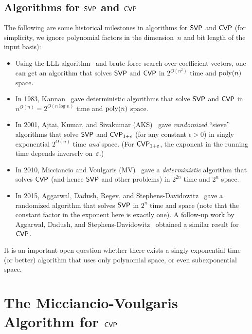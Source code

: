 \documentclass[11pt]{article}
\begin{document}
\subsection{Algorithms for $\mathsf{SVP}$ and $\mathsf{CVP}$}
\label{sec:algorithms-svp-cvp}

The following are some historical milestones in algorithms for $\mathsf{SVP}$
and $\mathsf{CVP}$ (for simplicity, we ignore polynomial factors in the
dimension~$n$ and bit length of the input basis):
\begin{itemize}[itemsep=0pt]
\item Using the LLL algorithm~\cite{lenstra82:_factor} and brute-force
  search over coefficient vectors, one can get an algorithm that
  solves $\mathsf{SVP}$ and $\mathsf{CVP}$ in $2^{O(n^{2})}$ time and $\operatorname{poly}(n)$
  space.
\item In 1983, Kannan~\cite{DBLP:conf/stoc/Kannan83} gave
  deterministic algorithms that solve $\mathsf{SVP}$ and $\mathsf{CVP}$ in
  $n^{O(n)} = 2^{O(n \log n)}$ time and $\operatorname{poly}(n)$ space.
\item In 2001, Ajtai, Kumar, and Sivakumar
  (AKS)~\cite{DBLP:conf/stoc/AjtaiKS01} gave \emph{randomized}
  ``sieve'' algorithms that solve $\mathsf{SVP}$ and $\mathsf{CVP}_{1+\epsilon}$ (for
  any constant $\epsilon > 0$) in singly exponential $2^{O(n)}$ time
  \emph{and} space. (For $\mathsf{CVP}_{1+\varepsilon}$, the exponent in the
  running time depends inversely on~$\varepsilon$.)
\item In 2010, Micciancio and Voulgaris
  (MV)~\cite{DBLP:conf/stoc/MicciancioV10} gave a \emph{deterministic}
  algorithm that solves $\mathsf{CVP}$ (and hence $\mathsf{SVP}$ and other problems)
  in $2^{2n}$ time and $2^{n}$ space.
\item In 2015, Aggarwal, Dadush, Regev, and
  Stephens-Davidowitz~\cite{DBLP:conf/stoc/AggarwalDRS15} gave a
  randomized algorithm that solves $\mathsf{SVP}$ in $2^{n}$ time and space
  (note that the constant factor in the exponent here is exactly one).
  A follow-up work by Aggarwal, Dadush, and
  Stephens-Davidowitz~\cite{DBLP:conf/focs/AggarwalDS15} obtained a
  similar result for $\mathsf{CVP}$.
\end{itemize}
It is an important open question whether there exists a singly
exponential-time (or better) algorithm that uses only polynomial
space, or even subexponential space.

\section{The Micciancio-Voulgaris Algorithm for $\mathsf{CVP}$}
\label{sec:mv-alg}
\end{document}

